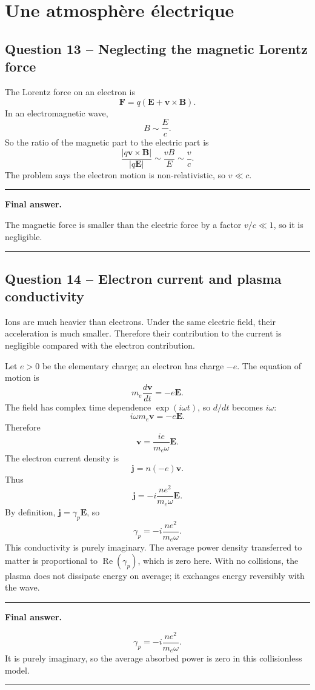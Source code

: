 \documentclass[11pt,a4paper]{article}
\newenvironment{finalanswer}{%
  \begin{center}\begin{minipage}{0.94\linewidth}\hrule\vspace{0.45em}\textbf{Final answer. }%
}{%
  \vspace{0.45em}\hrule\end{minipage}\end{center}%
}
\newcommand{\E}{\mathbf{E}}
\newcommand{\B}{\mathbf{B}}
\newcommand{\jv}{\mathbf{j}}
\begin{document}
\section{Une atmosph\`ere \'{e}lectrique}

\subsection*{Question 13 -- Neglecting the magnetic Lorentz force}

The Lorentz force on an electron is
\[
 \mathbf{F}=q(\E+\mathbf{v}\times\B).
\]
In an electromagnetic wave,
\[
 B\sim \frac{E}{c}.
\]
So the ratio of the magnetic part to the electric part is
\[
 \frac{|q\mathbf{v}\times\B|}{|q\E|}\sim\frac{vB}{E}\sim\frac{v}{c}.
\]
The problem says the electron motion is non-relativistic, so $v\ll c$.

\begin{finalanswer}
The magnetic force is smaller than the electric force by a factor $v/c\ll1$, so it is negligible.
\end{finalanswer}

\subsection*{Question 14 -- Electron current and plasma conductivity}

Ions are much heavier than electrons. Under the same electric field, their acceleration is much smaller. Therefore their contribution to the current is negligible compared with the electron contribution.

Let $e>0$ be the elementary charge; an electron has charge $-e$. The equation of motion is
\[
 m_e\frac{d\mathbf{v}}{dt}=-e\E.
\]
The field has complex time dependence $\exp(i\omega t)$, so $d/dt$ becomes $i\omega$:
\[
 i\omega m_e\mathbf{v}=-e\E.
\]
Therefore
\[
 \mathbf{v}=\frac{i e}{m_e\omega}\E.
\]
The electron current density is
\[
 \jv=n(-e)\mathbf{v}.
\]
Thus
\[
 \jv=-i\frac{n e^2}{m_e\omega}\E.
\]
By definition, $\jv=\gamma_p\E$, so
\[
 \gamma_p=-i\frac{n e^2}{m_e\omega}.
\]
This conductivity is purely imaginary. The average power density transferred to matter is proportional to $\operatorname{Re}(\gamma_p)$, which is zero here. With no collisions, the plasma does not dissipate energy on average; it exchanges energy reversibly with the wave.

\begin{finalanswer}
\[
\gamma_p=-i\frac{n e^2}{m_e\omega}.
\]
It is purely imaginary, so the average absorbed power is zero in this collisionless model.
\end{finalanswer}
\end{document}
